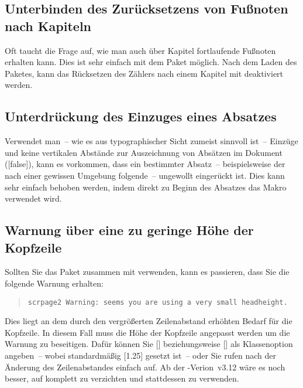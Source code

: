 \documentclass[%
  english,ngerman,%
  headings=optiontoheadandtoc,captions=tableheading,numbers=noenddot,%
  chapterpage,cdfoot,%
]{tudscrman}
\begin{document}
\subsection{Unterbinden des Zurücksetzens von Fußnoten nach Kapiteln}%
\label{sec:tat:counter}
Oft taucht die Frage auf, wie man auch über Kapitel fortlaufende Fußnoten 
erhalten kann. Dies ist sehr einfach mit dem Paket  möglich. 
Nach dem Laden des Paketes, kann das Rücksetzen des Zählers nach einem Kapitel 
mit  
deaktiviert werden.

\subsection{Unterdrückung des Einzuges eines Absatzes}
Verwendet man~-- wie es aus typographischer Sicht zumeist sinnvoll ist~-- 
Einzüge und keine vertikalen Abstände zur Auszeichnung von Absätzen im Dokument
([false]), kann es vorkommen, dass ein bestimmter Absatz~-- 
beispielsweise der nach einer gewissen Umgebung folgende~-- ungewollt eingerückt 
ist. Dies kann sehr einfach behoben werden, indem direkt zu Beginn des Absatzes 
das Makro  verwendet wird.

\subsection{Warnung über eine zu geringe Höhe der Kopfzeile}
\label{sec:tat:problemA}
Sollten Sie das Paket  zusammen mit  
verwenden, kann es passieren, dass Sie die folgende Warnung erhalten:
\begin{quote}
\begin{verbatim}
scrpage2 Warning: seems you are using a very small headheight.
\end{verbatim}
\end{quote}
Dies liegt an dem durch den vergrößerten Zeilenabstand erhöhten Bedarf für die
Kopfzeile. In diesem Fall muss die Höhe der Kopfzeile angepasst werden um die 
Warnung zu beseitigen. Dafür können Sie [] 
beziehungsweise [] als Klassenoption 
angeben~-- wobei standardmäßig [1.25] gesetzt ist~-- oder Sie 
rufen nach der Änderung des Zeilenabstandes einfach  auf. 
Ab der \KOMAScript{}-Verion~v3.12 wäre es noch besser, auf  
komplett zu verzichten und stattdessen  zu verwenden.
\end{document}
